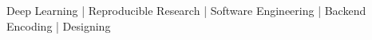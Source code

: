\begin{cvhonorsx}
  \cvhonorx
    {Deep Learning |  Reproducible Research | Software Engineering | Backend Encoding | Designing }
\end{cvhonorsx}

